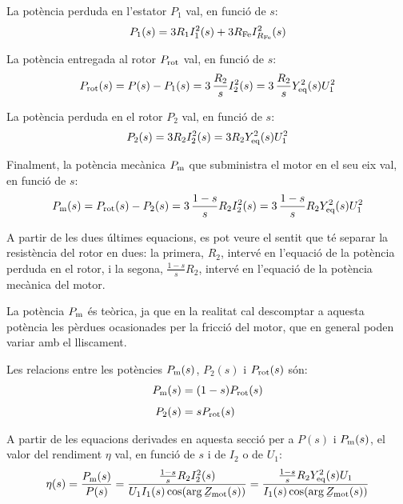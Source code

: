 La potència perduda en l'estator $P_1$ val, en funció de $s$:
\begin{equation}
    P_1(s)  =  3 R_1 I_1^2(s) + 3 R_\mathrm{Fe} I_{R_\mathrm{Fe}}^2(s)
\end{equation}

La potència entregada al rotor $P_\mathrm{rot}$  val, en funció de $s$:
\begin{equation}
    P_\mathrm{rot}(s)  =  P(s) - P_1(s) = 3 \,\frac{R_2}{s} I_2^2(s) = 3 \,\frac{R_2}{s} Y_\mathrm{eq}^2(s) U_1^2
\end{equation}

La potència perduda en el rotor $P_2$ val, en funció de $s$:
\begin{equation}
    P_2(s)  =  3 R_2 I_2^2(s) = 3 R_2 Y_\mathrm{eq}^2(s) U_1^2
\end{equation}

Finalment, la potència mecànica $P_\mathrm{m}$ que subministra el motor en el seu eix val, en funció de $s$:
\begin{equation}\index{motors d'inducció!potència mecànica}
    P\ped{m}(s)  =  P\ped{rot}(s) - P_2(s) = 3 \,\frac{1-s}{s} R_2 I_2^2(s) = 3 \,\frac{1-s}{s} R_2 Y\ped{eq}^2(s) U_1^2 \label{eq:Pm-I2-U1}
\end{equation}

A partir de les dues últimes equacions, es pot veure el sentit que té separar la resistència del rotor en dues: la primera, $R_2$,  intervé en l'equació de la potència perduda en el rotor, i la segona, $\frac{1-s}{s} R_2$,  intervé en l'equació de la potència mecànica del motor.

La potència $P_\mathrm{m}$  és teòrica, ja que en la realitat cal descomptar a aquesta potència les pèrdues ocasionades per la fricció del motor, que en general poden variar amb el lliscament.

Les relacions entre les potències   $P_\mathrm{m}(s)$,  $P_2(s)$ i $P_\mathrm{rot}(s)$ són:
\begin{subequations}
\begin{align}
    P_\mathrm{m}(s) &=  (1-s) P_\mathrm{rot}(s) \label{eq:Pm-Prot} \\[1ex]
    P_2(s) &=   s P_\mathrm{rot}(s)
\end{align}
\end{subequations}

A partir de les equacions derivades en aquesta secció per a $P(s)$ i $P_\mathrm{m}(s)$, el valor del rendiment $\eta$ val, en funció de $s$ i de $I_2$ o de $U_1$:
\begin{equation}\index{motors d'inducció!rendiment}
	\eta(s) = \frac{P\ped{m}(s)}{P(s)} = \frac{\frac{1-s}{s} R_2 I_2^2(s)}{U_1 I_1(s) \cos(\arg\cmplx{Z}\ped{mot}(s))} =  \frac{\frac{1-s}{s} R_2 Y\ped{eq}^2(s) U_1}{I_1(s) \cos(\arg\cmplx{Z}\ped{mot}(s))} \label{eq:mot-rendim}
\end{equation}

